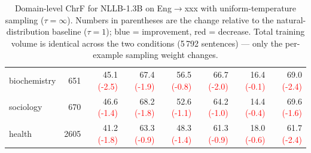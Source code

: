 \begin{table}[t]
\begin{tabular}{lrrrrrrr}
biochemistry & 651 & 45.1 \textcolor{red}{(-2.5)} & 67.4 \textcolor{red}{(-1.9)} & 56.5 \textcolor{red}{(-0.8)} & 66.7 \textcolor{red}{(-2.0)} & 16.4 \textcolor{red}{(-0.1)} & 69.0 \textcolor{red}{(-2.4)} \\
sociology & 670 & 46.6 \textcolor{red}{(-1.4)} & 68.2 \textcolor{red}{(-1.8)} & 52.6 \textcolor{red}{(-1.1)} & 64.2 \textcolor{red}{(-1.0)} & 14.4 \textcolor{red}{(-0.4)} & 69.6 \textcolor{red}{(-1.6)} \\
health & 2605 & 41.2 \textcolor{red}{(-1.8)} & 63.3 \textcolor{red}{(-0.9)} & 48.3 \textcolor{red}{(-1.4)} & 61.3 \textcolor{red}{(-0.9)} & 18.0 \textcolor{red}{(-0.6)} & 61.7 \textcolor{red}{(-2.4)} \\
\bottomrule
\end{tabular}
\caption{Domain-level ChrF for NLLB-1.3B on Eng$\to$xxx with uniform-temperature sampling ($\tau{=}\infty$). Numbers in parentheses are the change relative to the natural-distribution baseline ($\tau{=}1$); blue = improvement, red = decrease. Total training volume is identical across the two conditions (5\,792 sentences) --- only the per-example sampling weight changes.}
\label{tab:balance_domain_eng_xxx}
\end{table}
